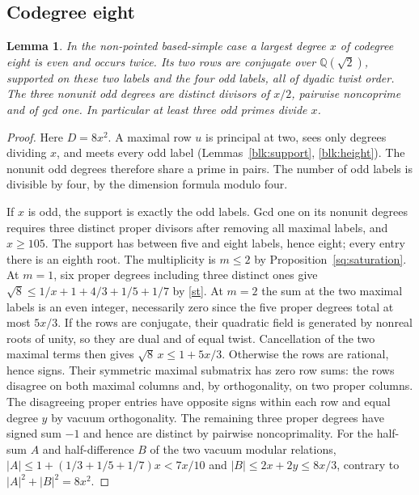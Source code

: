 \documentclass[11pt]{amsart}
\numberwithin{equation}{section}
\newtheorem{lemma}[theorem]{Lemma}
\theoremstyle{definition}
\theoremstyle{plain}
\newcommand{\QQ}{\mathbb Q}
\begin{document}
\subsection{Codegree eight}
\begin{lemma}\label{lem:eight-support}
In the non-pointed based-simple case a largest degree $x$ of codegree
eight is even and occurs twice. Its two rows are conjugate over
$\QQ(\sqrt2)$, supported on these two labels and the four odd labels,
all of dyadic twist order. The three nonunit odd degrees are distinct
divisors of $x/2$, pairwise noncoprime and of gcd one. In particular
at least three odd primes divide $x$.
\end{lemma}
\begin{proof}
Here $D=8x^2$. A maximal row $u$ is principal at two, sees only
degrees dividing $x$, and meets every odd label
(Lemmas~\ref{blk:support}, \ref{blk:height}). The nonunit odd degrees
therefore share a prime in pairs. The number of odd labels is
divisible by four, by the dimension formula modulo four.

If $x$ is odd, the support is exactly the odd labels. Gcd one on its
nonunit degrees requires three distinct proper divisors after removing
all maximal labels, and $x\ge105$. The support has between five and
eight labels, hence eight; every entry there is an eighth root.
The multiplicity is $m\le2$ by Proposition~\ref{sq:saturation}.
At $m=1$, six proper degrees including three distinct ones give
$\sqrt8\le1/x+1+4/3+1/5+1/7$ by \eqref{st}. At $m=2$ the sum at
the two maximal labels is an even integer, necessarily zero since
the five proper degrees total at most $5x/3$. If the rows are conjugate,
their quadratic field is generated by nonreal roots of unity, so they
are dual and of equal twist. Cancellation of the two maximal terms
then gives $\sqrt8\,x\le1+5x/3$. Otherwise the rows are rational,
hence signs. Their symmetric maximal submatrix has zero row sums:
the rows disagree on both maximal columns and, by orthogonality, on
two proper columns. The disagreeing proper entries have opposite
signs within each row and equal degree $y$ by vacuum orthogonality.
The remaining three proper degrees have signed sum $-1$ and hence
are distinct by pairwise noncoprimality. For the half-sum $A$ and
half-difference $B$ of the two vacuum modular relations,
$|A|\le1+(1/3+1/5+1/7)x<7x/10$ and $|B|\le2x+2y\le8x/3$,
contrary to $|A|^2+|B|^2=8x^2$.


\end{proof}
\end{document}
